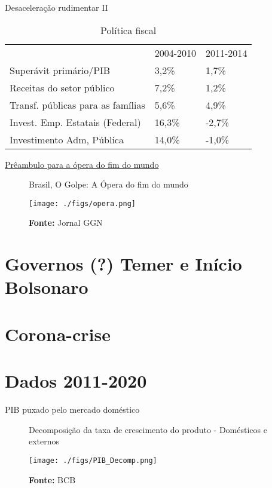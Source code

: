\documentclass[presentation]{beamer}
\begin{document}
\begin{frame}[label={sec:org48500d9}]{Desaceleração rudimentar II}
\begin{table}[htbp]
\caption{Política fiscal}
\centering
\begin{tabular}{lll}
\hline
 & 2004-2010 & 2011-2014\\
Superávit primário/PIB & 3,2\% & 1,7\%\\
Receitas do setor público & 7,2\% & 1,2\%\\
Transf. públicas para as famílias & 5,6\% & 4,9\%\\
Invest. Emp. Estatais (Federal) & 16,3\% & -2,7\%\\
Investimento Adm, Pública & 14,0\% & -1,0\%\\
\hline
\end{tabular}
\end{table}
\end{frame}


\begin{frame}[label={sec:org6cbab81}]{\href{https://www.causaoperaria.org.br/brasil-o-golpe-a-opera-do-fim-do-mundo-artista-retrata-o-golpe-de-estado-no-pais/}{Prêambulo para a ópera do fim do mundo}}
\begin{figure}[htb]
\centering
\caption{Brasil, O Golpe: A Ópera do fim do mundo} 
\texttt{[image: ./figs/opera.png]}
\caption*{\textbf{Fonte:} Jornal GGN}
\end{figure}
\end{frame}

\section{Governos (?) Temer e Início Bolsonaro}
\label{sec:orgdb8c4da}

\section{Corona-crise}
\label{sec:org86d3cda}
\section{Dados 2011-2020}
\label{sec:org3bc5120}



\begin{frame}[label={sec:orgb39e415}]{PIB puxado pelo mercado doméstico}
\begin{figure}[htb]
\centering
\caption{Decomposição da taxa de crescimento do produto - Domésticos e externos} 
\texttt{[image: ./figs/PIB\_Decomp.png]}
\label{fig:cycles}
\caption*{\textbf{Fonte:} BCB}
\end{figure}
\end{frame}
\end{document}
